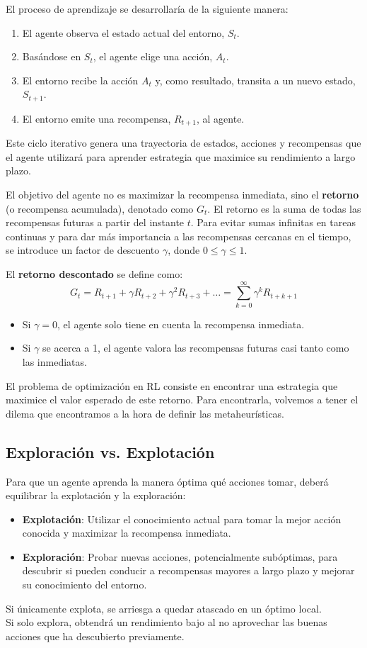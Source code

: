 \documentclass[12pt,a4paper]{book}
\begin{document}
El proceso de aprendizaje se desarrollaría de la siguiente manera:
\begin{enumerate}
    \item El agente observa el estado actual del entorno, $S_t$.
    \item Basándose en $S_t$, el agente elige una acción, $A_t$.
    \item El entorno recibe la acción $A_t$ y, como resultado, transita a un nuevo estado, $S_{t+1}$.
    \item El entorno emite una recompensa, $R_{t+1}$, al agente.
\end{enumerate}
Este ciclo iterativo genera una trayectoria de estados, acciones y recompensas que el agente utilizará para aprender estrategia que maximice su rendimiento a largo plazo.

El objetivo del agente no es maximizar la recompensa inmediata, sino el \textbf{retorno} (o recompensa acumulada), denotado como $G_t$.
El retorno es la suma de todas las recompensas futuras a partir del instante $t$. 
Para evitar sumas infinitas en tareas continuas y para dar más importancia a las recompensas cercanas en el tiempo, se introduce un factor de descuento $\gamma$, donde $0 \le \gamma \le 1$.

El \textbf{retorno descontado} se define como:
\[ G_t = R_{t+1} + \gamma R_{t+2} + \gamma^2 R_{t+3} + \dots = \sum_{k=0}^{\infty} \gamma^k R_{t+k+1} \]

\begin{itemize}
    \item Si $\gamma = 0$, el agente solo tiene en cuenta la recompensa inmediata.
    \item Si $\gamma$ se acerca a 1, el agente valora las recompensas futuras casi tanto como las inmediatas.
\end{itemize}

El problema de optimización en RL consiste en encontrar una estrategia que maximice el valor esperado de este retorno. Para encontrarla, volvemos a tener el dilema que encontramos a la 
hora de definir las metaheurísticas.

\subsection{Exploración vs. Explotación}

Para que un agente aprenda la manera  óptima qué acciones tomar, deberá equilibrar la explotación y la exploración:
\begin{itemize}
    \item \textbf{Explotación}: Utilizar el conocimiento actual para tomar la mejor acción conocida y maximizar la recompensa inmediata.
    \item \textbf{Exploración}: Probar nuevas acciones, potencialmente subóptimas, para descubrir si pueden conducir a recompensas mayores a largo plazo y mejorar su conocimiento del entorno.
\end{itemize}
Si únicamente explota, se arriesga a quedar atascado en un óptimo local.\\
Si solo explora, obtendrá un rendimiento bajo al no aprovechar las buenas acciones que ha descubierto previamente.
\end{document}
